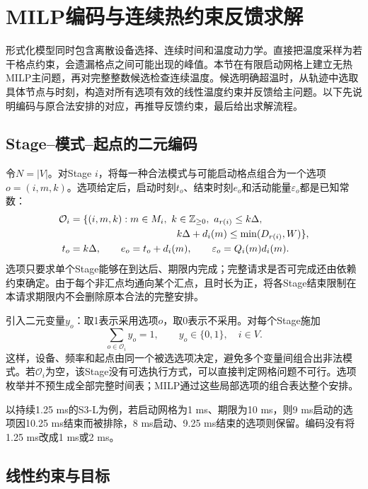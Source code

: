 \section{MILP编码与连续热约束反馈求解}
\label{sec:milp}

形式化模型同时包含离散设备选择、连续时间和温度动力学。直接把温度采样为若干格点约束，会遗漏格点之间可能出现的峰值。本节在有限启动网格上建立无热MILP主问题，再对完整整数候选检查连续温度。候选明确超温时，从轨迹中选取具体节点与时刻，构造对所有选项有效的线性温度约束并反馈给主问题。以下先说明编码与原合法安排的对应，再推导反馈约束，最后给出求解流程。

\subsection{Stage--模式--起点的二元编码}

令\(N=|V|\)。对Stage \(i\)，将每一种合法模式与可能启动格点组合为一个选项\(o=(i,m,k)\)。选项给定后，启动时刻\(t_o\)、结束时刻\(e_o\)和活动能量\(\varepsilon_o\)都是已知常数：
\begin{equation}
\begin{aligned}
\mathcal O_i&=\{(i,m,k):m\in M_i,\ k\in\mathbb Z_{\ge0},\ a_{r(i)}\le k\Delta,\\
&\hspace{38mm}k\Delta+d_i(m)\le\min(D_{r(i)},W)\},\\
t_o&=k\Delta,\qquad e_o=t_o+d_i(m),\qquad
\varepsilon_o=Q_i(m)d_i(m).
\end{aligned}
\label{eq:option}
\end{equation}
选项只要求单个Stage能够在到达后、期限内完成；完整请求是否可完成还由依赖约束确定。由于每个非汇点均通向某个汇点，且时长为正，将各Stage结束限制在本请求期限内不会删除原本合法的完整安排。

引入二元变量\(y_o\)：取1表示采用选项\(o\)，取0表示不采用。对每个Stage施加
\begin{equation}
\sum_{o\in\mathcal O_i}y_o=1,\qquad y_o\in\{0,1\},\quad i\in V.
\label{eq:unique-option}
\end{equation}
这样，设备、频率和起点由同一个被选选项决定，避免多个变量间组合出非法模式。若\(\mathcal O_i\)为空，该Stage没有可选执行方式，可以直接判定网格问题不可行。选项枚举并不预生成全部完整时间表；MILP通过这些局部选项的组合表达整个安排。

以持续1.25 ms的S3-L为例，若启动网格为1 ms、期限为10 ms，则9 ms启动的选项因10.25 ms结束而被排除，8 ms启动、9.25 ms结束的选项则保留。编码没有将1.25 ms改成1 ms或2 ms。

\subsection{线性约束与目标}

